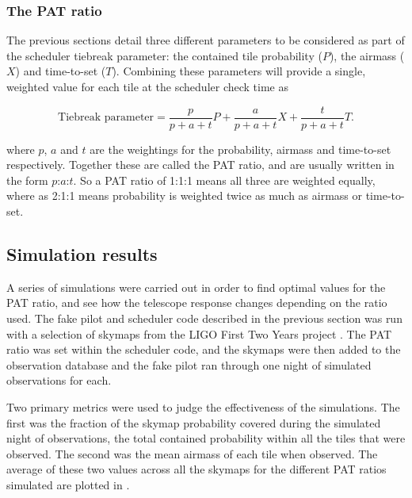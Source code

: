 \begin{colsection}
\begin{colsection}
\clearpage

\subsubsection{The PAT ratio}

The previous sections detail three different parameters to be considered as part of the scheduler tiebreak parameter: the contained tile probability ($P$), the airmass ($X$) and time-to-set ($T$). Combining these parameters will provide a single, weighted value for each tile at the scheduler check time as

\begin{equation}
    \text{Tiebreak parameter} = \frac{p}{p+a+t} P + \frac{a}{p+a+t} X + \frac{t}{p+a+t} T.
    \label{eq:pat}
\end{equation}

where $p$, $a$ and $t$ are the weightings for the probability, airmass and time-to-set respectively. Together these are called the PAT ratio, and are usually written in the form $p$:$a$:$t$. So a PAT ratio of 1:1:1 means all three are weighted equally, where as 2:1:1 means probability is weighted twice as much as airmass or time-to-set.

\end{colsection}



\subsection{Simulation results}
\label{sec:scheduler_sim_results}
\begin{colsection}

A series of simulations were carried out in order to find optimal values for the PAT ratio, and see how the telescope response changes depending on the ratio used. The fake pilot and scheduler code described in the previous section was run with a selection of skymaps from the LIGO First Two Years project \citep{First2Years}. The PAT ratio was set within the scheduler code, and the skymaps were then added to the observation database and the fake pilot ran through one night of simulated observations for each.

Two primary metrics were used to judge the effectiveness of the simulations. The first was the fraction of the skymap probability covered during the simulated night of observations, the total contained probability within all the tiles that were observed. The second was the mean airmass of each tile when observed. The average of these two values across all the skymaps for the different PAT ratios simulated are plotted in .


\end{colsection}
\end{colsection}
